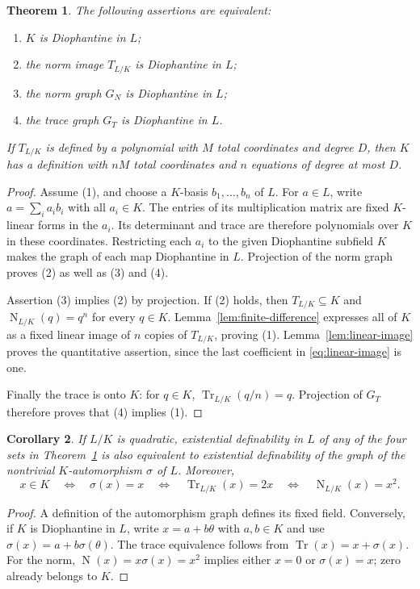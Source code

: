 \documentclass[11pt,a4paper]{article}
\newtheorem{theorem}{Theorem}[section]
\newtheorem{corollary}[theorem]{Corollary}
\theoremstyle{definition}
\newcommand{\Tr}{\operatorname{Tr}}
\newcommand{\Nm}{\operatorname{N}}
\begin{document}
\begin{theorem}\label{thm:norm-trace}
The following assertions are equivalent:
\begin{enumerate}
\item $K$ is Diophantine in $L$;
\item the norm image $T_{L/K}$ is Diophantine in $L$;
\item the norm graph $G_N$ is Diophantine in $L$;
\item the trace graph $G_T$ is Diophantine in $L$.
\end{enumerate}
If $T_{L/K}$ is defined by a polynomial with $M$ total coordinates
and degree $D$, then $K$ has a definition with $nM$ total
coordinates and $n$ equations of degree at most $D$.
\end{theorem}
\begin{proof}
Assume (1), and choose a $K$-basis $b_1,\ldots,b_n$ of $L$.
For $a\in L$, write $a=\sum_i a_i b_i$ with all $a_i\in K$.
The entries of its multiplication matrix are fixed $K$-linear
forms in the $a_i$. Its determinant and trace are therefore
polynomials over $K$ in these coordinates. Restricting each
$a_i$ to the given Diophantine subfield $K$ makes the graph of
each map Diophantine in $L$. Projection of the norm graph proves
(2) as well as (3) and (4).

Assertion (3) implies (2) by projection. If (2) holds, then
$T_{L/K}\subseteq K$ and
$\Nm_{L/K}(q)=q^n$ for every $q\in K$.
Lemma~\ref{lem:finite-difference} expresses all of $K$ as a fixed
linear image of $n$ copies of $T_{L/K}$, proving (1).
Lemma~\ref{lem:linear-image} proves the quantitative assertion,
since the last coefficient in \eqref{eq:linear-image} is one.

Finally the trace is onto $K$: for $q\in K$,
$\Tr_{L/K}(q/n)=q$. Projection of $G_T$ therefore proves that
(4) implies (1).
\end{proof}

\begin{corollary}\label{cor:quadratic}
If $L/K$ is quadratic, existential definability in $L$ of any of
the four sets in Theorem~\ref{thm:norm-trace} is also equivalent
to existential definability of the graph of the nontrivial
$K$-automorphism $\sigma$ of $L$.
Moreover,
\[
 x\in K\quad\Longleftrightarrow\quad\sigma(x)=x
 \quad\Longleftrightarrow\quad\Tr_{L/K}(x)=2x
 \quad\Longleftrightarrow\quad\Nm_{L/K}(x)=x^2.
\]
\end{corollary}
\begin{proof}
A definition of the automorphism graph defines its fixed field.
Conversely, if $K$ is Diophantine in $L$, write
$x=a+b\theta$ with $a,b\in K$ and use
$\sigma(x)=a+b\sigma(\theta)$.
The trace equivalence follows from
$\Tr(x)=x+\sigma(x)$.
For the norm, $\Nm(x)=x\sigma(x)=x^2$ implies either $x=0$ or
$\sigma(x)=x$; zero already belongs to $K$.
\end{proof}
\end{document}
